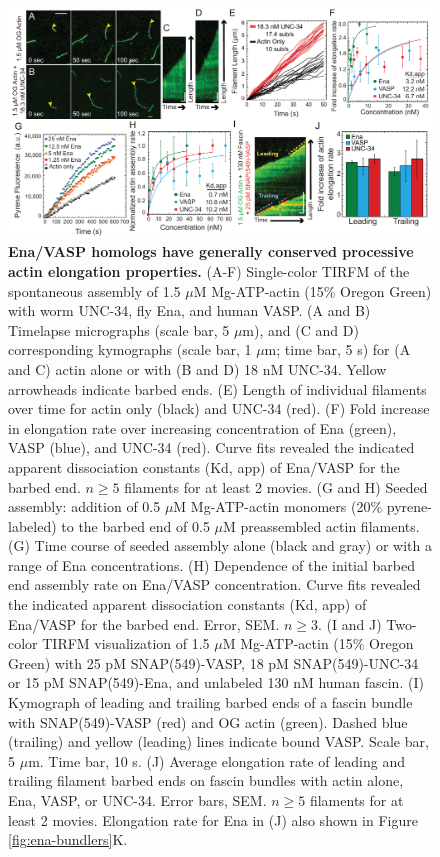 \begin{figure}
\centering
\includegraphics[width=\textwidth]{img/ch02/Supp_Figure_1.pdf}
\caption[Ena/VASP homologs have generally conserved processive actin elongation properties.]{\textbf{Ena/VASP homologs have generally conserved processive actin elongation properties.} (A-F) Single-color TIRFM of the spontaneous assembly of 1.5 $\mu$M Mg-ATP-actin (15\% Oregon Green) with worm UNC-34, fly Ena, and human VASP. (A and B) Timelapse micrographs (scale bar, 5 $\mu$m), and (C and D) corresponding kymographs (scale bar, 1 $\mu$m; time bar, 5 s) for (A and C) actin alone or with (B and D) 18 nM UNC-34. Yellow arrowheads indicate barbed ends. (E) Length of individual filaments over time for actin only (black) and UNC-34 (red). (F) Fold increase in elongation rate over increasing concentration of Ena (green), VASP (blue), and UNC-34 (red). Curve fits revealed the indicated apparent dissociation constants (Kd, app) of Ena/VASP for the barbed end. $n \geq 5$ filaments for at least 2 movies. (G and H) Seeded assembly: addition of 0.5 $\mu$M Mg-ATP-actin monomers (20\% pyrene-labeled) to the barbed end of 0.5 $\mu$M preassembled actin filaments. (G) Time course of seeded assembly alone (black and gray) or with a range of Ena concentrations. (H) Dependence of the initial barbed end assembly rate on Ena/VASP concentration. Curve fits revealed the indicated apparent dissociation constants (Kd, app) of Ena/VASP for the barbed end. Error, SEM. $n \geq 3$. (I and J) Two-color TIRFM visualization of 1.5 $\mu$M Mg-ATP-actin (15\% Oregon Green) with 25 pM SNAP(549)-VASP, 18 pM SNAP(549)-UNC-34 or 15 pM SNAP(549)-Ena, and unlabeled 130 nM human fascin. (I) Kymograph of leading and trailing barbed ends of a fascin bundle with SNAP(549)-VASP (red) and OG actin (green). Dashed blue (trailing) and yellow (leading) lines indicate bound VASP. Scale bar, 5 $\mu$m. Time bar, 10 s. (J) Average elongation rate of leading and trailing filament barbed ends on fascin bundles with actin alone, Ena, VASP, or UNC-34. Error bars, SEM. $n \geq 5$ filaments for at least 2 movies. Elongation rate for Ena in (J) also shown in Figure \ref{fig:ena-bundlers}K.}
\label{fig:ena-homologs}
\end{figure}

